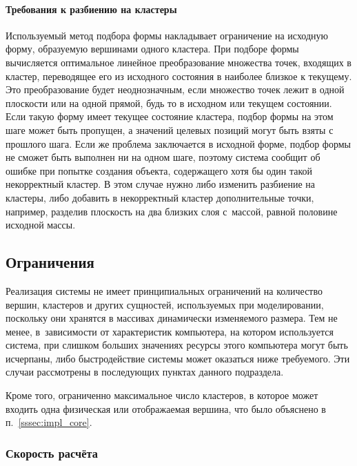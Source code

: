 \documentclass[a4paper, 14pt, titlepage]{extarticle}
\begin{document}
      \paragraph{Требования к разбиению на кластеры}
      Используемый метод подбора формы накладывает ограничение на исходную форму, образуемую
      вершинами одного кластера. При подборе формы вычисляется оптимальное линейное преобразование
      множества точек, входящих в кластер, переводящее его из исходного состояния в наиболее близкое
      к текущему. Это преобразование будет неоднозначным, если множество точек лежит в одной
      плоскости или на одной прямой, будь то в исходном или текущем состоянии. Если такую форму
      имеет текущее состояние кластера, подбор формы на этом шаге может быть пропущен, а значений
      целевых позиций могут быть взяты с прошлого шага. Если же проблема заключается в
      исходной форме, подбор формы не сможет быть выполнен ни на одном шаге, поэтому система сообщит
      об ошибке при попытке создания объекта, содержащего хотя бы один такой некорректный кластер.
      В этом случае нужно либо изменить разбиение на кластеры, либо добавить в некорректный кластер
      дополнительные точки, например, разделив плоскость на два близких слоя с~массой, равной
      половине исходной массы.

    \subsection{Ограничения}\label{sssec:limitations}

      Реализация системы не имеет принципиальных ограничений на количество вершин, кластеров и других сущностей,
      используемых при моделировании, поскольку они хранятся в массивах динамически изменяемого размера.
      Тем не менее, в~зависимости от характеристик компьютера, на котором используется система, при слишком
      больших значениях ресурсы этого компьютера могут быть исчерпаны, либо быстродействие системы
      может оказаться ниже требуемого. Эти случаи рассмотрены в последующих пунктах данного
      подраздела.

      Кроме того, ограниченно максимальное число кластеров, в которое может входить одна физическая
      или отображаемая вершина, что было объяснено в п.~\ref{sssec:impl_core}.

      \subsubsection{Скорость расчёта}
\end{document}
